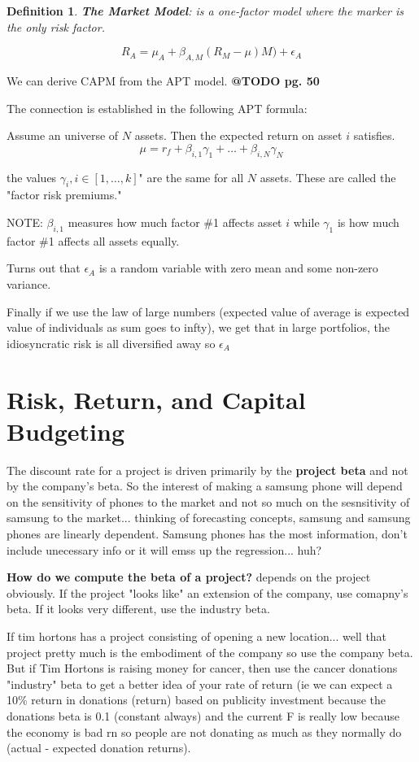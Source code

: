 \documentclass{article}
\newtheorem{definition}{Definition}
\begin{document}
\begin{definition}
\textbf{The Market Model}: is a one-factor model where the marker is the only risk factor.
\end{definition}
\[ R_A = \mu_A + \beta_{A,M} (R_M - \mu)M) + \epsilon_A \]

We can derive CAPM from the APT model. \textbf{@TODO pg. 50}

The connection is established in the following APT formula: 

Assume an universe of $N$ assets. Then the expected return on asset $i$ satisfies.
\[ \mu = r_f + \beta_{i,1} \gamma_1 + \dots + 
\beta_{i,N} \gamma_N
\]

the values $\gamma_i, i \in [1,\dots, k]$" are the same for all $N$ assets. These are called the "factor risk premiums." 

NOTE: $\beta_{i,1}$ measures how much factor \#1 affects asset $i$ while $\gamma_1$ is how much factor \#1 affects all assets equally. 
 
Turns out that $\epsilon_A$ is a random variable with zero mean and some non-zero variance. 

Finally if we use the law of large numbers (expected value of average is expected value of individuals as sum goes to infty), we get that in large portfolios, the idiosyncratic risk is all diversified away so $\epsilon_A$


\section{Risk, Return, and Capital Budgeting}
The discount rate for a project is driven primarily by the \textbf{project beta} and not by the company's beta. So the interest of making a samsung phone will depend on the sensitivity of phones to the market and not so much on the sesnsitivity of samsung to the market... thinking of forecasting concepts, samsung and samsung phones are linearly dependent. Samsung phones has the most information, don't include unecessary info or it will emss up the regression... huh?

\newpage

\textbf{How do we compute the beta of a project?} depends on the project obviously.
If the project "looks like" an extension of the company, use comapny's beta. If it looks very different, use the industry beta.


If tim hortons has a project consisting of opening a new location... well that project pretty much is the embodiment of the company so use the company beta. But if Tim Hortons is raising money for cancer, then use the cancer donations "industry" beta to get a better idea of your rate of return (ie we can expect a 10\% return in donations (return) based on publicity investment because the donations beta is 0.1 (constant always) and the current F is really low because the economy is bad rn so people are not donating as much as they normally do (actual - expected donation returns).
\end{document}
